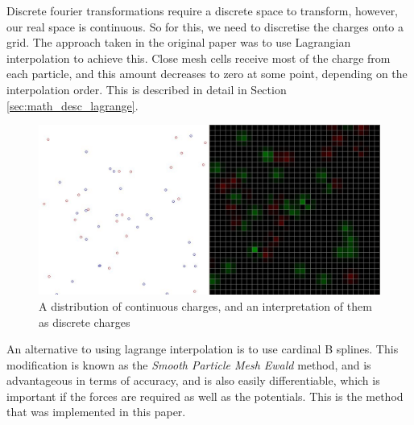 \documentclass[pdftex,twoside,a4paper]{report}
\newcommand{\bcen}{\begin{center}}
\newcommand{\ecen}{\end{center}}
\begin{document}
Discrete fourier transformations require a discrete space to transform, however, our real space is continuous. So for this, we need to discretise the charges onto a grid. The approach taken in the original paper was to use Lagrangian interpolation to achieve this. Close mesh cells receive most of the charge from each particle, and this amount decreases to zero at some point, depending on the interpolation order. This is described in detail in Section \ref{sec:math_desc_lagrange}.\\
\begin{figure}[H]
\bcen \includegraphics[width=\textwidth]{figures/Qarray.jpg} \ecen
\caption{A distribution of continuous charges, and an interpretation of them as discrete charges}
\end{figure}

An alternative to using lagrange interpolation is to use cardinal B splines. This modification is known as the \emph{Smooth Particle Mesh Ewald} method, and is advantageous in terms of accuracy, and is also easily differentiable, which is important if the forces are required as well as the potentials.  \cite{essmann:8577} This is the method that was implemented in this paper.
\end{document}
